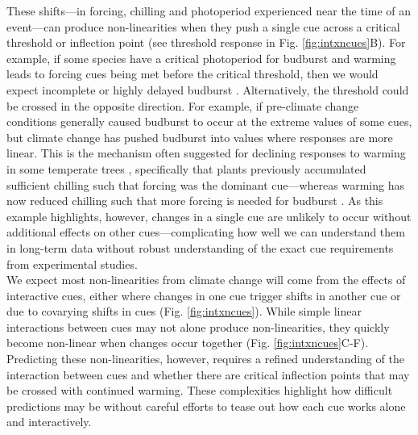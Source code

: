 \documentclass[11pt,letter]{article}
\begin{document}
These shifts---in forcing, chilling and photoperiod experienced near the time of an event---can produce non-linearities when they push a single cue across a critical threshold or inflection point (see threshold response in Fig. \ref{fig:intxncues}B). For example, if some species have a critical photoperiod for budburst and warming leads to forcing cues being met before the critical threshold, then we would expect incomplete or highly delayed budburst \citep{Singh:2017,rinne2018}. Alternatively, the threshold could be crossed in the opposite direction. For example, if pre-climate change conditions generally caused budburst to occur at the extreme values of some cues, but climate change has pushed budburst into values where responses are more linear. This is the mechanism often suggested for declining responses to warming in some temperate trees \citep{fu2015,piao2017,gauzere2019}, specifically that plants previously accumulated sufficient chilling such that forcing was the dominant cue---whereas warming has now reduced chilling such that more forcing is needed for budburst \citep[producing an overall muted effect when estimated as change in days per $\degree$C, see][for one example]{fu2015}. As this example highlights, however, changes in a single cue are unlikely to occur without additional effects on other cues---complicating how well we can understand them in long-term data without robust understanding of the exact cue requirements from experimental studies.\\

We expect most non-linearities from climate change will come from the effects of interactive cues, either where changes in one cue trigger shifts in another cue or due to covarying shifts in cues (Fig. \ref{fig:intxncues}). While simple linear interactions between cues may not alone produce non-linearities, they quickly become non-linear when changes occur together (Fig. \ref{fig:intxncues}C-F). Predicting these non-linearities, however, requires a refined understanding of the interaction between cues and whether there are critical inflection points that may be crossed with continued warming. These complexities highlight how difficult predictions may be without careful efforts to tease out how each cue works alone and interactively. 
\end{document}
